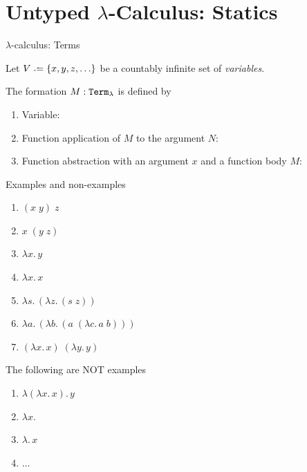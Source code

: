 \section{Untyped $\lambda$-Calculus: Statics}

\begin{frame}{$\lambda$-calculus: Terms}

Let $V \defeq \{ x, y, z, \ldots \}$ be a countably infinite set of
\emph{variables}.
\begin{definition}
  The formation $M : \term_\lambda$ is defined by
  \begin{enumerate}
    \item Variable:
      \begin{prooftree}
      \end{prooftree}

    \item Function application of $M$ to the argument $N$:
      \begin{prooftree}
      \end{prooftree}

    \item Function abstraction with an argument $x$ and a function body $M$:
      \begin{prooftree}
      \end{prooftree}
  \end{enumerate}
\end{definition}
\end{frame}

\begin{frame}{Examples and non-examples}
  \begin{enumerate}
    \item $(x\;y)\;z$
    \item $x\;(y\; z)$
    \item $\lambda x.\, y$
    \item $\lambda x.\, x$
    \item $\lambda s.\,(\lambda z.\, (s \;z))$
    \item $\lambda a.\,(\lambda b.\, (a\;(\lambda c.\, a\; b)))$
    \item $(\lambda x.\, x)\;(\lambda y.\, y)$
  \end{enumerate}
  The following are NOT examples
  \begin{enumerate}
    \item $\lambda (\lambda x.\, x).\, y$
    \item $\lambda x. $
    \item $\lambda.\, x$
    \item $\dots$
  \end{enumerate}
\end{frame}

